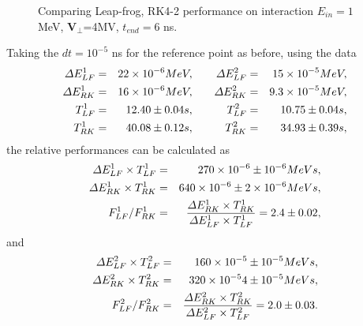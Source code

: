 \documentclass[a4paper,oneside,12pt]{report}
\numberwithin{equation}{chapter}
\begin{document}
{\begin{figure}[H]
    \vspace{15pt}
    \caption{Comparing Leap-frog, RK4-2 performance on \eE interaction $E_{in}=1$MeV, $\textbf{V}_{\perp}$=4MV, $t_{end}=6$ ns.}
    \label{fig:lf_rk2_perp_stat_E_comparison}
\end{figure}
Taking the $dt=10^{-5}$ ns for the reference point as before, using the data
\vspace{-10pt}\begin{eqnarray*}
    \begin{aligned}
        \Delta E_{LF}^1 &=& 22 \times 10^{-6} MeV, \\
        \Delta E_{RK}^1 &=& 16 \times 10^{-6} MeV, \\
        T_{LF}^1 &=& 12.40 \pm 0.04 s, \\
        T_{RK}^1 &=& 40.08 \pm 0.12 s, 
    \end{aligned}
    \qquad
    \begin{aligned}
        \Delta E_{LF}^2 &=& 15 \times 10^{-5} MeV, \\
        \Delta E_{RK}^2 &=& 9.3 \times 10^{-5} MeV, \\
        T_{LF}^2 &=& 10.75 \pm 0.04 s, \\
        T_{RK}^2 &=& 34.93 \pm 0.39 s, 
    \end{aligned}
\vspace{-20pt}\end{eqnarray*}
the relative performances can be calculated as
\vspace{-10pt}\begin{eqnarray} 
    \Delta E_{LF}^1 \times T_{LF}^1 &=& 270 \times 10^{-6} \pm 10^{-6} MeV s, \\ %
    \Delta E_{RK}^1 \times T_{RK}^1 &=& 640 \times 10^{-6} \pm 2\times 10^{-6}  MeV s, \\ %
    F_{LF}^1/F_{RK}^1 &=& \frac{\Delta E_{RK}^1 \times T_{RK}^1 }{\Delta E_{LF}^1 \times T_{LF}^1} = 2.4 \pm 0.02, \label{eq:f_lf_rk_1}
\vspace{-20pt}\end{eqnarray}
and
\vspace{-10pt}\begin{eqnarray}  
    \Delta E_{LF}^2 \times T_{LF}^2 &=& 160 \times 10^{-5} \pm 10^{-5} MeV s, \\ %
    \Delta E_{RK}^2 \times T_{RK}^2 &=& 320 \times 10^{-5} 4 \pm 10^{-5} MeV s, \\ %
    F_{LF}^2/F_{RK}^2 &=& \frac{\Delta E_{RK}^2 \times T_{RK}^2 }{\Delta E_{LF}^2 \times T_{LF}^2} = 2.0  \pm 0.03. \label{eq:f_lf_rk_2}
\vspace{-10pt}\end{eqnarray}

}
\end{document}
